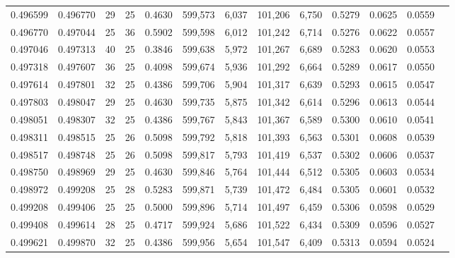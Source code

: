 \begin{tabular}{rrrrrrrrrrrrr}
0.496599 & 0.496770 &    29 &  25 &                                     0.4630 & 599,573 &   6,037 & 101,206 &   6,750 & 0.5279 & 0.0625 & 0.0559 \\
0.496770 & 0.497044 &    25 &  36 &                                     0.5902 & 599,598 &   6,012 & 101,242 &   6,714 & 0.5276 & 0.0622 & 0.0557 \\
0.497046 & 0.497313 &    40 &  25 &                                     0.3846 & 599,638 &   5,972 & 101,267 &   6,689 & 0.5283 & 0.0620 & 0.0553 \\
0.497318 & 0.497607 &    36 &  25 &                                     0.4098 & 599,674 &   5,936 & 101,292 &   6,664 & 0.5289 & 0.0617 & 0.0550 \\
0.497614 & 0.497801 &    32 &  25 &                                     0.4386 & 599,706 &   5,904 & 101,317 &   6,639 & 0.5293 & 0.0615 & 0.0547 \\
0.497803 & 0.498047 &    29 &  25 &                                     0.4630 & 599,735 &   5,875 & 101,342 &   6,614 & 0.5296 & 0.0613 & 0.0544 \\
0.498051 & 0.498307 &    32 &  25 &                                     0.4386 & 599,767 &   5,843 & 101,367 &   6,589 & 0.5300 & 0.0610 & 0.0541 \\
0.498311 & 0.498515 &    25 &  26 &                                     0.5098 & 599,792 &   5,818 & 101,393 &   6,563 & 0.5301 & 0.0608 & 0.0539 \\
0.498517 & 0.498748 &    25 &  26 &                                     0.5098 & 599,817 &   5,793 & 101,419 &   6,537 & 0.5302 & 0.0606 & 0.0537 \\
0.498750 & 0.498969 &    29 &  25 &                                     0.4630 & 599,846 &   5,764 & 101,444 &   6,512 & 0.5305 & 0.0603 & 0.0534 \\
0.498972 & 0.499208 &    25 &  28 &                                     0.5283 & 599,871 &   5,739 & 101,472 &   6,484 & 0.5305 & 0.0601 & 0.0532 \\
0.499208 & 0.499406 &    25 &  25 &                                     0.5000 & 599,896 &   5,714 & 101,497 &   6,459 & 0.5306 & 0.0598 & 0.0529 \\
0.499408 & 0.499614 &    28 &  25 &                                     0.4717 & 599,924 &   5,686 & 101,522 &   6,434 & 0.5309 & 0.0596 & 0.0527 \\
0.499621 & 0.499870 &    32 &  25 &                                     0.4386 & 599,956 &   5,654 & 101,547 &   6,409 & 0.5313 & 0.0594 & 0.0524 \\

\end{tabular}
